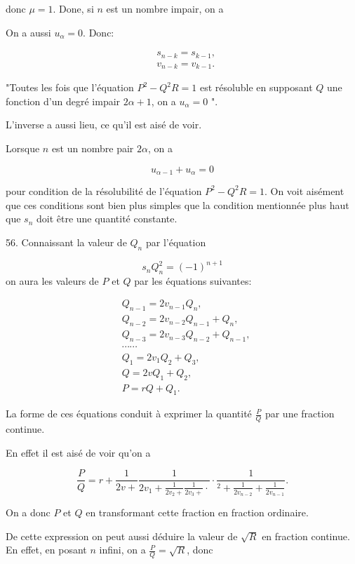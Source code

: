 \documentclass{article}
\begin{document}
donc \(\mu=1\). Done, si \(n\) est un nombre impair, on a

On a aussi \(u_{\alpha}=0\). Donc:

\[
\begin{aligned}
& s_{n-k}=s_{k-1}, \\
& v_{n-k}=v_{k-1} .
\end{aligned}
\]

"Toutes les fois que l'équation \(P^{2}-Q^{2} R=1\) est résoluble en supposant \(Q\) une fonction d'un degré impair \(2 \alpha+1\), on a \(u_{\alpha}=0\) ".

L'inverse a aussi lieu, ce qu'il est aisé de voir.

Lorsque \(n\) est un nombre pair \(2 \alpha\), on a

\[
u_{\alpha-1}+u_{\alpha}=0
\]

pour condition de la résolubilité de l'équation \(P^{2}-Q^{2} R=1\). On voit aisément que ces conditions sont bien plus simples que la condition mentionnée plus haut que \(s_{n}\) doit être une quantité constante.

56. Connaissant la valeur de \(Q_{n}\) par l'équation

\[
s_{n} Q_{n}^{2}=(-1)^{n+1}
\]
on aura les valeurs de \(P\) et \(Q\) par les équations suivantes:

\[
\begin{aligned}
& Q_{n-1}=2 v_{n-1} Q_{n}, \\
& Q_{n-2}=2 v_{n-2} Q_{n-1}+Q_{n}, \\
& Q_{n-3}=2 v_{n-3} Q_{n-2}+Q_{n-1}, \\
& \cdots \cdots \\
& Q_{1}=2 v_{1} Q_{2}+Q_{3}, \\
& Q=2 v Q_{1}+Q_{2}, \\
& P=r Q+Q_{1} .
\end{aligned}
\]

La forme de ces équations conduit à exprimer la quantité \(\frac{P}{Q}\) par une fraction continue.

En effet il est aisé de voir qu'on a

\[
\frac{P}{Q}=r+\frac{1}{2 v+} \frac{1}{2 v_{1}+\frac{1}{2 v_{2}+} \frac{1}{2 v_{3}+} \cdot} \cdot \frac{1}{{ }^{2}+\frac{1}{2 v_{n-2}}+\frac{1}{2 v_{n-1}}} .
\]

On a donc \(P\) et \(Q\) en transformant cette fraction en fraction ordinaire.

De cette expression on peut aussi déduire la valeur de \(\sqrt{R}\) en fraction continue. En effet, en posant \(n\) infini, on a \(\frac{P}{Q}=\sqrt{R}\), donc
\end{document}
